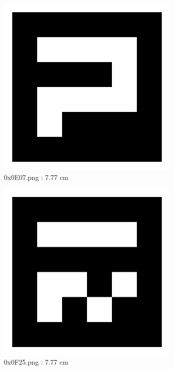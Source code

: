 \documentclass[11pt,a4,BCOR=0cm]{scrartcl}
\begin{document}
\begin{figure}
  \centering
    \includegraphics[natwidth=400,natheight=400,width=9cm]{0x0E07.png}
    \caption{0x0E07.png : 7.77 cm}
    \label{fig:0x0E07.png}
  
\end{figure} 

\begin{figure}
  \centering
    \includegraphics[natwidth=400,natheight=400,width=9cm]{0x0F25.png}
    \caption{0x0F25.png : 7.77 cm}
    \label{fig:0x0F25.png}
  
\end{figure} 

\clearpage
\end{document}
